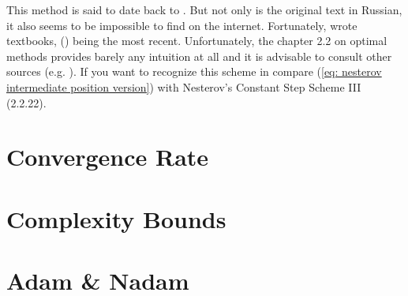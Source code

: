 %
\begin{remark}
	This method is said to date back to \textcite{nesterovMethodSolvingConvex1983}.
	But not only is the original text in Russian, it also seems to be impossible
	to find on the internet. Fortunately, \citeauthor{nesterovMethodSolvingConvex1983}
	wrote textbooks, 
	(\citeyear{nesterovLecturesConvexOptimization2018}) being the most recent.
	Unfortunately, the chapter 2.2 on optimal methods provides barely any
	intuition at all and it is advisable to consult other sources (e.g.
	\textcite{dontlooWhatDifferenceMomentum2016}). If you
	want to recognize this scheme in \textcite{nesterovLecturesConvexOptimization2018}
	compare (\ref{eq: nesterov intermediate position version}) with Nesterov's
	Constant Step Scheme III (2.2.22).
 \end{remark}



\section{Convergence Rate}

\section{Complexity Bounds}

\section{Adam \& Nadam}


\endinput
